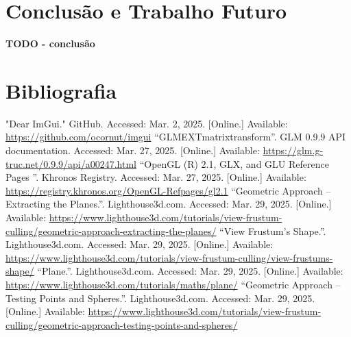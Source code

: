 \documentclass[12pt, a4paper]{article}
\begin{document}
\section{Conclusão e Trabalho Futuro}

\textbf{\color{red} TODO - conclusão}

\begingroup
\section{Bibliografia}
\renewcommand{\section}[2]{}

\begin{thebibliography}{9}
        "Dear ImGui."{} GitHub. Accessed: Mar. 2, 2025. [Online.] Available:
        \url{https://github.com/ocornut/imgui}
        ``GLM\textunderscore EXT\textunderscore matrix\textunderscore transform''. GLM 0.9.9 API
        documentation. Accessed: Mar. 27, 2025. [Online.] Available:
        \url{https://glm.g-truc.net/0.9.9/api/a00247.html}
        ``OpenGL (R) 2.1, GLX, and GLU Reference Pages ''. Khronos Registry.
        Accessed: Mar. 27, 2025. [Online.] Available:
        \url{https://registry.khronos.org/OpenGL-Refpages/gl2.1}
        ``Geometric Approach -- Extracting the Planes.''. Lighthouse3d.com. Accessed:
        Mar. 29, 2025. [Online.] Available:
        \url{https://www.lighthouse3d.com/tutorials/view-frustum-culling/geometric-approach-extracting-the-planes/}
        ``View Frustum’s Shape.''. Lighthouse3d.com. Accessed:
        Mar. 29, 2025. [Online.] Available:
        \url{https://www.lighthouse3d.com/tutorials/view-frustum-culling/view-frustums-shape/}
        ``Plane.''. Lighthouse3d.com. Accessed:
        Mar. 29, 2025. [Online.] Available:
        \url{https://www.lighthouse3d.com/tutorials/maths/plane/}
        ``Geometric Approach -- Testing Points and Spheres.''. Lighthouse3d.com. Accessed:
        Mar. 29, 2025. [Online.] Available:
        \url{https://www.lighthouse3d.com/tutorials/view-frustum-culling/geometric-approach-testing-points-and-spheres/}
\end{thebibliography}
\endgroup
\end{document}

